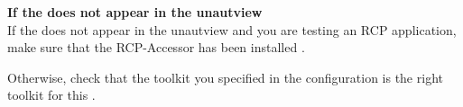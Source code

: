 \textbf{If the \gdaut{} does not appear in the \jb{}unautview{}}\\
If the \gdaut{} does not appear in the \jb{}unautview{} and you are testing an RCP application, make sure that the RCP-Accessor has been installed . 

Otherwise, check that the toolkit you specified in the \gdaut{} configuration  is the right toolkit for this \gdaut{}. 

